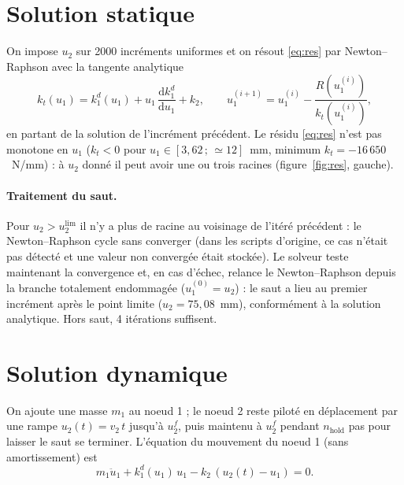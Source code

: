 \documentclass[11pt,a4paper]{article}
\newcommand{\dd}{\mathrm{d}}
\newcommand{\kd}{k_1^{d}}
\begin{document}
\section{Solution statique}
\label{sec:stat}
On impose $u_2$ sur 2000 incréments uniformes et on résout \eqref{eq:res} par Newton--Raphson avec
la tangente analytique
\begin{equation}
  k_t(u_1) = \kd(u_1) + u_1\,\frac{\dd\kd}{\dd u_1} + k_2,\qquad
  u_1^{(i+1)} = u_1^{(i)} - \frac{R(u_1^{(i)})}{k_t(u_1^{(i)})},
\end{equation}
en partant de la solution de l'incrément précédent. Le résidu \eqref{eq:res} n'est pas monotone en
$u_1$ ($k_t<0$ pour $u_1\in[3{,}62\,;\,\simeq12]$~mm, minimum $k_t = -16\,650$~N/mm) : à $u_2$ donné
il peut avoir une ou trois racines (figure~\ref{fig:res}, gauche).

\paragraph{Traitement du saut.}
Pour $u_2 > u_2^{\lim}$ il n'y a plus de racine au voisinage de l'itéré précédent : le
Newton--Raphson cycle sans converger (dans les scripts d'origine, ce cas n'était pas détecté et une
valeur non convergée était stockée). Le solveur teste maintenant la convergence et, en cas d'échec,
relance le Newton--Raphson depuis la branche totalement endommagée ($u_1^{(0)}=u_2$) : le saut a
lieu au premier incrément après le point limite ($u_2 = 75{,}08$~mm), conformément à la solution
analytique. Hors saut, 4 itérations suffisent.

\section{Solution dynamique}
\label{sec:dyn}
On ajoute une masse $m_1$ au noeud 1 ; le noeud 2 reste piloté en déplacement par une rampe
$u_2(t)=v_2\,t$ jusqu'à $u_2^f$, puis maintenu à $u_2^f$ pendant $n_{\text{hold}}$ pas pour laisser le
saut se terminer. L'équation du mouvement du noeud 1 (sans amortissement) est
\begin{equation}
  m_1\ddot u_1 + \kd(u_1)\,u_1 - k_2\,(u_2(t)-u_1) = 0 .
\end{equation}
\end{document}
